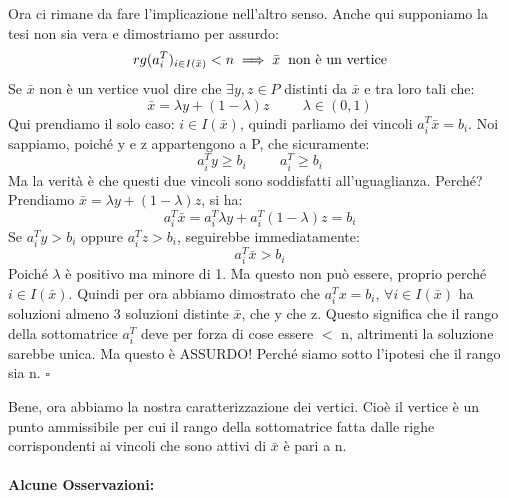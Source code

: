 \vspace{1cm} Ora ci rimane da fare l'implicazione nell'altro senso. Anche qui supponiamo la tesi non sia vera e dimostriamo per assurdo:
\begin{equation*}
    rg(a_i^T)_{i\in I(\bar{x})} < n \implies \bar{x} \hspace{0.2cm} \text{non è un vertice}
\end{equation*}
Se $\bar{x}$ non è un vertice vuol dire che $\exists y,z \in P$ distinti da $\bar{x}$ e tra loro tali che:
\begin{equation*}
    \bar{x} = \lambda y + (1 - \lambda)z \hspace{1cm} \lambda \in (0,1)
\end{equation*}
Qui prendiamo il solo caso: $i \in I(\bar{x})$, quindi parliamo dei vincoli $a_i^T\bar{x} = b_i$. Noi sappiamo, poiché y e z appartengono a P, che sicuramente:
\begin{equation*}
    a_i^Ty \geq b_i \hspace{1cm} a_i^T \geq b_i
\end{equation*}
Ma la verità è che questi due vincoli sono soddisfatti all'uguaglianza. Perché? Prendiamo $\bar{x} = \lambda y + (1 - \lambda)z$, si ha:
\begin{equation*}
    a_i^T\bar{x} = a_i^T\lambda y + a_i^T(1 - \lambda)z = b_i
\end{equation*}
Se $a_i^Ty > b_i$ oppure $a_i^Tz > b_i$, seguirebbe immediatamente:
\begin{equation*}
    a_i^T\bar{x} > b_i
\end{equation*}
Poiché $\lambda$ è positivo ma minore di 1. Ma questo non può essere, proprio perché $i \in I(\bar{x})$. Quindi per ora abbiamo dimostrato che $a_i^Tx = b_i$, $\forall i \in I(\bar{x})$ ha soluzioni almeno 3 soluzioni distinte $\bar{x}$, che y che z. Questo significa che il rango della sottomatrice $a_i^T$ deve per forza di cose essere $<$ n, altrimenti la soluzione sarebbe unica. Ma questo è ASSURDO! Perché siamo sotto l'ipotesi che il rango sia n. $\square$

\vspace{1cm}

\noindent Bene, ora abbiamo la nostra caratterizzazione dei vertici. Cioè il vertice è un punto ammissibile per cui il rango della sottomatrice fatta dalle righe corrispondenti ai vincoli che sono attivi di $\bar{x}$ è pari a n.

\paragraph{Alcune Osservazioni:} 

